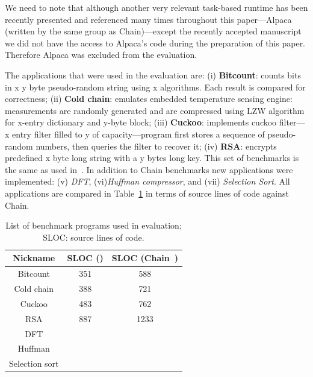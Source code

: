 We need to note that although another very relevant task-based runtime has been recently presented and referenced many times throughout this paper---Alpaca~\cite{alpaca} (written by the same group as Chain)---except the recently accepted manuscript we did not have the access to Alpaca's code during the preparation of this paper. Therefore Alpaca was excluded from the evaluation. 

The applications that were used in the evaluation are: (i) \textbf{Bitcount}: counts bits in x y byte pseudo-random string using x algorithms. Each result is compared for correctness; (ii) \textbf{Cold chain}: emulates embedded temperature sensing engine: measurements are randomly generated and are compressed using LZW algorithm for x-entry dictionary and y-byte block; (iii) \textbf{Cuckoo}: implements cuckoo filter---x entry filter filled to y of capacity---program first stores a sequence of pseudo-random numbers, then queries the filter to recover it; (iv) \textbf{RSA}: encrypts predefined x byte long string with a y bytes long key. This set of benchmarks is the same as used in~\cite{chain,alpaca}. In addition to Chain benchmarks new applications were implemented: (v) \emph{DFT}, (vi)\emph{Huffman compressor}, and (vii) \emph{Selection Sort}. All applications are compared in Table~\ref{table:benchmark_list} in terms of source lines of code against Chain. 

\begin{table}[t]
	\centering
	\footnotesize
	\begin{tabular}{|c|c|c|}
		\hline
		Nickname & SLOC (\sys) & SLOC (Chain~\cite{chain})\\
		\hline\hline
		Bitcount & 351 & 588 \\ %
		Cold chain & 388 & 721 \\ %
		Cuckoo & 483 & 762 \\ %
		RSA & 887 & 1233 \\ %
		DFT & {} & {} \\ %
		Huffman & {} & {} \\ %
		Selection sort & {} & {} \\
		\hline
	\end{tabular}
\caption{List of benchmark programs used in \sys evaluation; SLOC: source lines of code.}
\label{table:benchmark_list}
\end{table}

